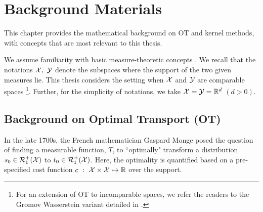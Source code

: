 \chapter{Background Materials}
\label{chap:chbg}

This chapter provides the mathematical background on OT and kernel methods, with concepts that are most relevant to this thesis. 

We assume familiarity with basic measure-theoretic concepts \citep{rudin}.
We recall that the notations $\mathcal{X}, \ \mathcal{Y}$ denote the subspaces where the support of the two given measures lie. This thesis considers the setting when $\mathcal{X}$ and $\mathcal{Y}$ are comparable spaces \footnote{For an extension of OT to incomparable spaces, we refer the readers to the Gromov Wasserstein variant detailed in \cite{tvayer-thesis}.}. Further, for the simplicity of notations, we take $\mathcal{X}=\mathcal{Y}=\mathbb{R}^d$ $(d>0)$. 
\section{Background on Optimal Transport (OT)}\label{bg:ot}
In the late 1700s, the French mathematician Gaspard Monge posed the question of finding a measurable function, $T$, to ``optimally" transform a distribution $s_0\in \mathcal{R}_1^+(\mathcal{X})$ to $t_0\in \mathcal{R}_1^+(\mathcal{X})$. Here, the optimality is quantified based on a pre-specified cost function $c~:~\mathcal{X}\times \mathcal{X} \mapsto \mathbb{R}$ over the support. 

